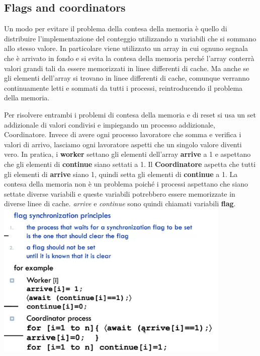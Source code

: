 \documentclass[10pt,a4paper]{book}
\begin{document}
\subsection{Flags and coordinators}
Un modo per evitare il problema della contesa della memoria è quello di distribuire l'implementazione del conteggio utilizzando n variabili che si sommano allo stesso valore. In particolare viene utilizzato un array in cui ognuno segnala che è arrivato in fondo e si evita la contesa della memoria perché l'array conterrà valori grandi tali da essere memorizzati in linee differenti di cache. Ma anche se gli elementi dell'array si trovano in linee differenti di cache, comunque verranno continuamente letti e sommati da tutti i processi, reintroducendo il problema della memoria.

Per risolvere entrambi i problemi di contesa della memoria e di reset si usa un set addizionale di valori condivisi e impiegando un processo addizionale, Coordinatore. Invece di avere ogni processo lavoratore che somma e verifica i valori di arrivo, lasciamo ogni lavoratore aspetti che un singolo valore diventi vero.
In pratica, i \textbf{worker} settano gli elementi dell'array \textbf{arrive} a 1 e aspettano che gli elementi di \textbf{continue} siano settati a 1.
Il \textbf{Coordinatore} aspetta che tutti gli elementi di \textbf{arrive} siano 1, quindi setta gli elementi di \textbf{continue} a 1.
La contesa della memoria non è un problema poiché i processi aspettano che siano settate diverse variabili e queste variabili potrebbero essere memorizzate in diverse linee di cache.
\textit{arrive} e \textit{continue} sono quindi chiamati variabili \textbf{flag}.\\

\includegraphics[scale=0.6]{img/flag.png} \\ \\
\end{document}
